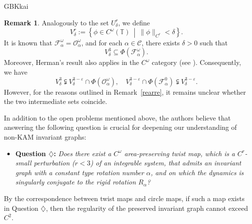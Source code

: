 \documentclass{amsart}
\theoremstyle{definition}
\newtheorem{Remark}[Definition]{Remark}
\begin{document}
\begin{CJK*}{GBK}{kai}
\begin{Remark}
Analogously to the set $U_\delta^r$, we define
\[
V^r_\delta := \left\{ \phi \in C^\omega(\mathbb{T}) \ \middle| \ \|\phi\|_{C^{r}} < \delta \right\}.
\]
It is known \cite{H11,H1} that $\mathcal{F}_\alpha^\omega = \mathcal{O}_\alpha^\omega$, and for each $\alpha \in \mathcal{C}$, there exists $\delta > 0$ such that
\begin{equation}\label{hkamx}
V_\delta^3 \subseteq \Phi(\mathcal{F}_\alpha^\omega).
\end{equation}
Moreover, Herman's result \cite[Theorem 4.9]{H1} also applies in the $C^\omega$ category (see \cite{W22}). Consequently, we have
\[
V_\delta^{3} \subsetneqq V_\delta^{3 - \varepsilon} \cap \Phi(\mathcal{O}_\alpha^\omega), \quad
V_\delta^{3 - \varepsilon} \cap \Phi(\mathcal{F}_\alpha^0) \subsetneqq V_\delta^{3 - \varepsilon}.
\]
However, for the reasons outlined in Remark~\ref{rearre}, it remains unclear whether the two intermediate sets coincide.
\end{Remark}

	\vspace{1ex}

In addition to the open problems mentioned above, the authors believe that answering the following question is crucial for deepening our understanding of non-KAM invariant graphs:

\begin{itemize}
    \item \textbf{Question $\diamondsuit$:} \textit{Does there exist a $C^\omega$ area-preserving twist map, which is a $C^r$-small perturbation ($r < 3$) of an integrable system, that admits an invariant graph with a constant type rotation number $\alpha$, and on which the dynamics is singularly conjugate to the rigid rotation $R_\alpha$?}
\end{itemize}

By the correspondence between twist maps and circle maps, if such a map exists in Question $\diamondsuit$, then the regularity of the preserved invariant graph cannot exceed $C^2$.



	 \vspace{2em}


\end{CJK*}
\end{document}
